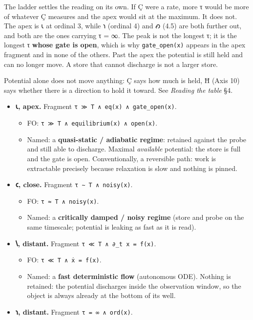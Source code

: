 The ladder settles the reading on its own. If Ç were a rate, more τ
would be more of whatever Ç measures and the apex would sit at the
maximum. It does not. The apex is 𐑧 at ordinal 3, while 𐑪 (ordinal 4)
and 𐑺 (4.5) are both further out, and both are the ones carrying τ = ∞.
The peak is not the longest τ; it is the longest τ \textbf{whose gate is
open}, which is why \texttt{gate\_open(x)} appears in the apex fragment
and in none of the others. Past the apex the potential is still held and
can no longer move. A store that cannot discharge is not a larger store.

Potential alone does not move anything: Ç says how much is held, Ħ (Axis
10) says whether there is a direction to hold it toward. See
\emph{Reading the table} §4.

\begin{itemize}
\tightlist
\item
  \textbf{𐑧, apex.} Fragment
  \texttt{τ\ ≫\ T\ ∧\ eq(x)\ ∧\ gate\_open(x)}.

  \begin{itemize}
  \tightlist
  \item
    FO: \texttt{τ\ ≫\ T\ ∧\ equilibrium(x)\ ∧\ open(x)}.
  \item
    Named: a \textbf{quasi-static / adiabatic regime}: retained against
    the probe and still able to discharge. Maximal \emph{available}
    potential: the store is full and the gate is open. Conventionally, a
    reversible path: work is extractable precisely because relaxation is
    slow and nothing is pinned.
  \end{itemize}
\item
  \textbf{𐑤, close.} Fragment \texttt{τ\ ∼\ T\ ∧\ noisy(x)}.

  \begin{itemize}
  \tightlist
  \item
    FO: \texttt{τ\ ≈\ T\ ∧\ noisy(x)}.
  \item
    Named: a \textbf{critically damped / noisy regime} (store and probe
    on the same timescale; potential is leaking as fast as it is read).
  \end{itemize}
\item
  \textbf{𐑘, distant.} Fragment \texttt{τ\ ≪\ T\ ∧\ ∂\_t\ x\ =\ f(x)}.

  \begin{itemize}
  \tightlist
  \item
    FO: \texttt{τ\ ≪\ T\ ∧\ ẋ\ =\ f(x)}.
  \item
    Named: a \textbf{fast deterministic flow} (autonomous ODE). Nothing
    is retained: the potential discharges inside the observation window,
    so the object is always already at the bottom of its well.
  \end{itemize}
\item
  \textbf{𐑪, distant.} Fragment \texttt{τ\ =\ ∞\ ∧\ ord(x)}.


\end{itemize}
